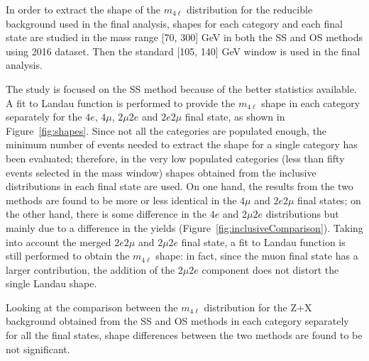 In order to extract the shape of the $m_{4\ell}$ distribution for the reducible background used in the final analysis, 
shapes for each category and each final state are studied in the mass range [70, 300] GeV in both the SS and OS methods using 2016 dataset. 
Then the standard [105, 140] GeV window is used in the final analysis.

The study is focused on the SS method because of the better statistics available. 
A fit to Landau function is performed to provide the $m_{4\ell}$ shape in each category separately for the $4e$, $4\mu$, $2\mu2e$ and $2e2\mu$ final state, 
as shown in Figure~\ref{fig:shapes}. 
Since not all the categories are populated enough, the minimum number of events needed to extract the shape for a single category has been evaluated; 
therefore, in the very low populated categories (less than fifty events selected in the mass window) 
shapes obtained from the inclusive distributions in each final state are used.
%
%
On one hand, the results from the two methods are found to be more or less identical in the $4\mu$ and $2e2\mu$ final states; 
on the other hand, there is some difference in the $4e$ and $2\mu2e$ distributions but mainly due to a difference in the yields (Figure~\ref{fig:inclusiveComparison}). 
Taking into account the merged $2e2\mu$ and $2\mu2e$ final state, a fit to Landau function is still performed to obtain the $m_{4\ell}$ shape:
in fact, since the muon final state has a larger contribution, the addition of the $2\mu2e$ component does not distort the single Landau shape.

Looking at the comparison between the $m_{4\ell}$ distribution for the Z+X background obtained from the SS and OS methods in each category separately for all the final states,
shape differences between the two methods are found to be not significant. 

